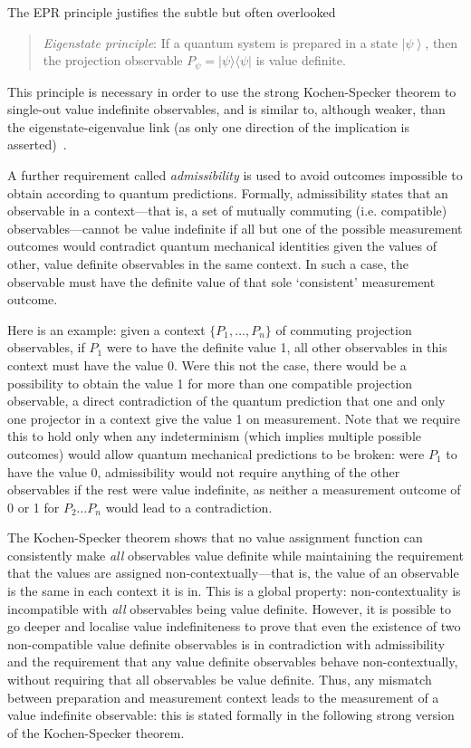 \documentclass[%
 superscriptaddress,
 preprint,
 showpacs,
 showkeys,
 preprintnumbers,
 nofootinbib,
  amsmath,amssymb,
  aps,
 pra,
  longbibliography,
  floatfix,
 ]{revtex4-1}
\theoremstyle{definition}
\newcommand{\ket}[1]{\left| #1 \right>}
\newcommand{\oprod}[2]{| #1 \rangle\langle #2 |}
\begin{document}
The EPR principle justifies the subtle but often overlooked 
\begin{quote}\emph{Eigenstate principle}:
If a quantum system is prepared in a state $\ket{\psi}$, then the projection observable $P_\psi=\oprod{\psi}{\psi}$ is value definite.
\end{quote}
This principle is necessary in order to use the strong Kochen-Specker theorem to single-out value indefinite observables, and is similar to, although weaker, than the eigenstate-eigenvalue link (as only one direction of the implication is asserted)~\cite{Suarez:2004gn}.

 A further requirement called \emph{admissibility} is used to avoid outcomes  impossible to obtain according to quantum predictions.
Formally, admissibility states that an observable in a context---that is, a set of mutually commuting (i.e. compatible) observables---cannot be value indefinite if all but one of the possible measurement outcomes would contradict quantum mechanical identities given the values of other, value definite observables in the same context.
In such a case, the observable must have the definite value of that sole `consistent' measurement outcome.

Here is an example: given a context $\{P_1,\dots,P_n\}$ of commuting projection observables, if $P_1$ were to have the definite value 1, all other observables in this context must have the value 0.
Were this not the case, there would be a possibility to obtain the value 1 for more than one compatible projection observable, a direct contradiction of the quantum prediction that one and only one projector in a context give the value 1 on measurement.
Note that we require this to hold only when any indeterminism (which implies multiple possible outcomes) would allow quantum mechanical predictions to be broken:
were $P_1$ to have the value 0, admissibility would not require anything of the other observables if the rest were value indefinite, as neither a measurement outcome of 0 or 1 for $P_2\dots P_n$ would lead to a contradiction.

The Kochen-Specker theorem \cite{kochen1} shows that no value assignment function can consistently make \emph{all} observables value definite while maintaining the requirement that the values are assigned non-contextually---that is, the value of an observable is the same in each context it is in.
This is a global property: non-contextuality is incompatible with \emph{all} observables being value definite.
However, it is possible to go deeper and localise value indefiniteness to prove that even the existence of two non-compatible value definite observables is in contradiction with admissibility and the requirement that any value definite observables behave non-contextually, without requiring that all observables be value definite.
Thus, any mismatch between preparation and measurement context leads to the measurement of a value indefinite observable: this is stated formally in the following strong version of the Kochen-Specker theorem.
\end{document}
